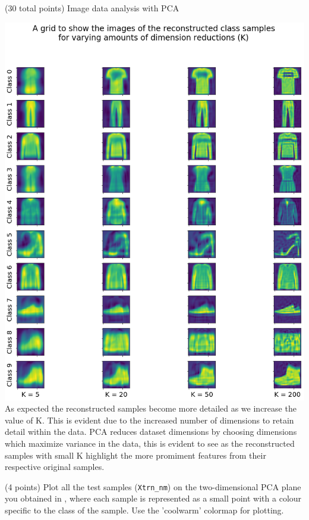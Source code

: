 \documentclass[12pt]{article}
\begin{document}
\begin{question}{(30 total points) Image data analysis with PCA}
\begin{subquestion}
   

      \begin{answerbox}{52em}
         \includegraphics[width=1\textwidth]{images/q17.png}
        \footnotesize{
        As expected the reconstructed samples become more detailed as we increase the value of K. This is evident due to the increased number of dimensions to retain detail within the data. PCA reduces dataset dimensions by choosing dimensions which maximize variance in the data, this is evident to see as the reconstructed samples with small K highlight the more promiment features from their respective original samples.}
      \end{answerbox}
  


   \end{subquestion}
   \begin{subquestion}{(4 points)
       Plot all the test samples (\texttt{Xtrn\_nm}) on the
       two-dimensional PCA plane you obtained in , where each sample is
       represented as a small point with a colour specific to the class of
       the sample.  Use the 'coolwarm' colormap for plotting.
     } \label{Q1.8}



\end{subquestion}
\end{question}
\end{document}
